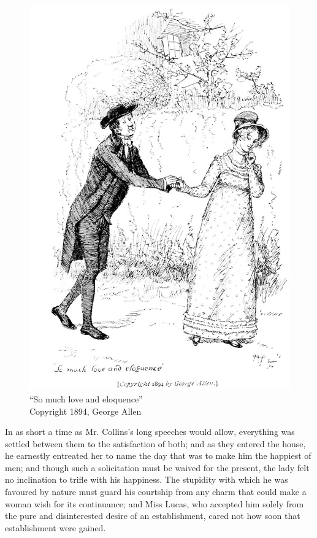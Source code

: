 \begin{figure}[htbp]
    \centering
    \includegraphics[width=\textwidth]{illustrations/i_185.jpg}
    \caption{“So much love and eloquence”\\ Copyright 1894, George Allen}
    \label{fig:image}
\end{figure}

In as short a time as Mr. Collins's long speeches would allow, everything was settled between them to the satisfaction of both; and as they entered the house, he earnestly entreated her to name the day that was to make him the happiest of men; and though such a solicitation must be waived for the present, the lady felt no inclination to trifle with his happiness. The stupidity with which he was favoured by nature must guard his courtship from any charm that could make a woman wish for its continuance; and Miss Lucas, who accepted him solely from the pure and disinterested desire of an establishment, cared not how soon that establishment were gained.

